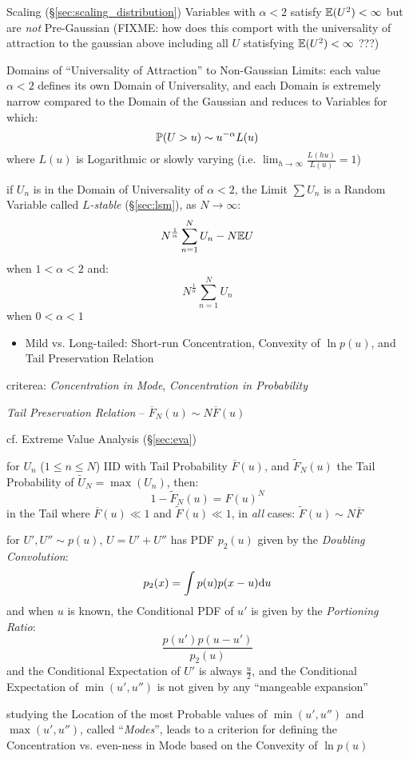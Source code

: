 Scaling (\S\ref{sec:scaling_distribution}) Variables with $\alpha < 2$ satisfy
$\mathbb{E}(U^2) < \infty$ but are \emph{not} Pre-Gaussian
(FIXME: how does this comport with the universality of attraction to the
gaussian above including all $U$ statisfying $\mathbb{E}(U^2) < \infty$ ???)

Domains of ``Universality of Attraction'' to Non-Gaussian Limits: each value
$\alpha < 2$ defines its own Domain of Universality, and each Domain is
extremely narrow compared to the Domain of the Gaussian and reduces to Variables
for which:
\[
  \mathbb{P}(U > u) \sim u^{-\alpha} L(u)
\]
where $L(u)$ is Logarithmic or slowly varying (i.e.
$\lim_{h \to \infty} \frac{L(hu)}{L(u)} = 1$)

if $U_n$ is in the Domain of Universality of $\alpha < 2$, the Limit $\sum U_n$
is a Random Variable called \emph{$L$-stable} (\S\ref{sec:lsm}), as
$N \to \infty$:
\[
  N^\frac{1}{\alpha} \sum_{n=1}^N U_n - N \mathbb{E}{U}
\]
when $1 < \alpha < 2$ and:
\[
  N^\frac{1}{\alpha} \sum_{n=1}^N U_n
\]
when $0 < \alpha < 1$

\begin{itemize}
  \item Mild vs. Long-tailed: Short-run Concentration, Convexity of $\ln p(u)$,
    and Tail Preservation Relation
\end{itemize}

criterea: \emph{Concentration in Mode}, \emph{Concentration in Probability}

\emph{Tail Preservation Relation} -- $\overline{F}_N(u) \sim N \overline{F}(u)$

cf. Extreme Value Analysis (\S\ref{sec:eva})

for $U_n$ ($1 \leq n \leq N$) IID with Tail Probability $\overline{F}(u)$, and
$\tilde{F}_N(u)$ the Tail Probability of $\tilde{U}_N = \max(U_n)$, then:
\[
  1 - \tilde{F}_N(u) = F(u)^N
\]
in the Tail where $\overline{F}(u) \ll 1$ and $\tilde{F}(u) \ll 1$, in
\emph{all} cases: $\tilde{F}(u) \sim N \overline{F}$

for $U', U'' \sim p(u)$, $U = U' + U''$ has PDF $p_2(u)$ given by the
\emph{Doubling Convolution}:
\[
  p_2(x) = \int p(u) p(x - u) \mathrm{d}u
\]
and when $u$ is known, the Conditional PDF of $u'$ is given by the
\emph{Portioning Ratio}:
\[
  \frac{p(u') p(u - u')}{p_2(u)}
\]
and the Conditional Expectation of $U'$ is always $\frac{u}{2}$, and the
Conditional Expectation of $\min(u', u'')$ is not given by any ``mangeable
expansion''

studying the Location of the most Probable values of $\min(u', u'')$ and
$\max(u', u'')$, called ``\emph{Modes}'', leads to a criterion for defining the
Concentration vs. even-ness in Mode based on the Convexity of $\ln p(u)$

